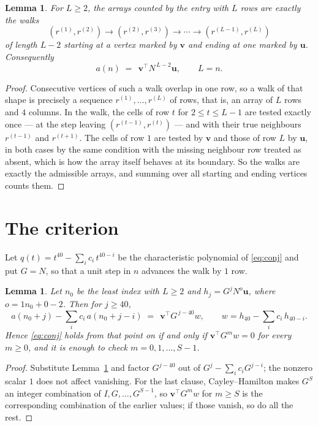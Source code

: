 \documentclass[11pt,a4paper]{article}
\theoremstyle{plain}
\newtheorem{lemma}[theorem]{Lemma}
\theoremstyle{definition}
\begin{document}
\begin{lemma}\label{lem:walk}
For $L\ge2$, the arrays counted by the entry with $L$ rows are exactly the walks
\[
(r^{(1)},r^{(2)})\to(r^{(2)},r^{(3)})\to\cdots\to(r^{(L-1)},r^{(L)})
\]
of length $L-2$ starting at a vertex marked by $\mathbf{v}$ and ending at one marked by
$\mathbf{u}$. Consequently
\[
a(n)\;=\;\,\mathbf{v}^{\!\top}N^{\,L-2}\mathbf{u},\qquad L=n .
\]
\end{lemma}

\begin{proof}
Consecutive vertices of such a walk overlap in one row, so a walk of that shape is
precisely a sequence $r^{(1)},\dots,r^{(L)}$ of rows, that is, an array of $L$ rows
and $4$ columns. In the walk, the cells of row $t$ for $2\le t\le L-1$ are tested
exactly once --- at the step leaving $(r^{(t-1)},r^{(t)})$ --- and with their true
neighbours $r^{(t-1)}$ and $r^{(t+1)}$. The cells of row $1$ are tested by
$\mathbf{v}$ and those of row $L$ by $\mathbf{u}$, in both cases by the same condition
with the missing neighbour row treated as absent, which is how the array itself behaves at
its boundary. So the walks are exactly the admissible arrays, and summing over all starting
and ending vertices counts them.
\end{proof}

\section{The criterion}

Let $q(t)=t^{40}-\sum_i c_i\,t^{40-i}$ be the characteristic polynomial of
\eqref{eq:conj} and put $G=N$, so that a unit step in $n$ advances the walk by
$1$ row.

\begin{lemma}\label{lem:crit}
Let $n_0$ be the least index with $L\ge2$ and $h_j=G^{j}N^{o}\mathbf{u}$, where
$o=1n_0+0-2$. Then for $j\ge40$,
\[
a(n_0+j)-\sum_i c_i\,a(n_0+j-i)\;=\;\,\mathbf{v}^{\!\top}G^{\,j-40}w,
\qquad w=h_{40}-\sum_i c_i\,h_{40-i} .
\]
Hence \eqref{eq:conj} holds from that point on if and only if
$\mathbf{v}^{\!\top}G^{m}w=0$ for every $m\ge0$, and it is enough to check
$m=0,1,\dots,S-1$.
\end{lemma}

\begin{proof}
Substitute Lemma~\ref{lem:walk} and factor $G^{j-40}$ out of
$G^{j}-\sum_ic_iG^{j-i}$; the nonzero scalar $1$ does not affect
vanishing. For the last clause, Cayley--Hamilton makes $G^{S}$ an integer combination of
$I,G,\dots,G^{S-1}$, so $\mathbf{v}^{\!\top}G^{m}w$ for $m\ge S$ is the corresponding
combination of the earlier values; if those vanish, so do all the rest.
\end{proof}
\end{document}
